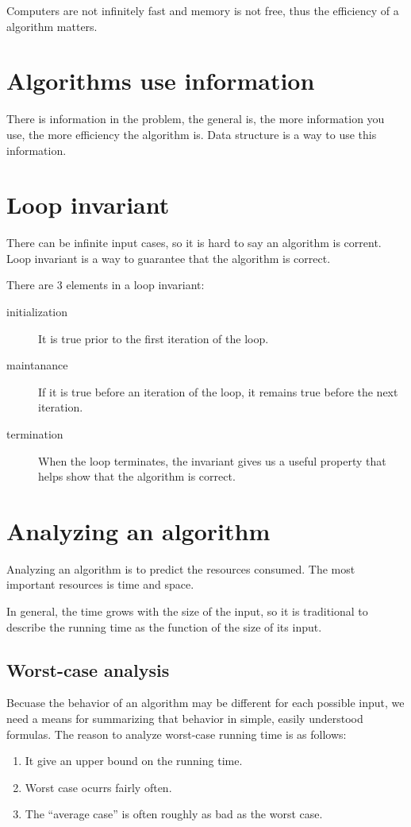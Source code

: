 Computers are not infinitely fast and memory is not free, thus the efficiency of a algorithm matters.


\section{Algorithms use information}


There is information in the problem, the general is, the more information you use, the more efficiency the algorithm is.
Data structure is a way to use this information.


\section{Loop invariant}

There can be infinite input cases, so it is hard to say an algorithm is corrent.
Loop invariant is a way to guarantee that the algorithm is correct.


There are 3 elements in a loop invariant:
\begin{description}
\item[initialization] It is true prior to the first iteration of the loop.
\item[maintanance] If it is true before an iteration of the loop, it remains true before the next iteration.
\item[termination] When the loop terminates, the invariant gives us a useful property that helps show that the algorithm is correct.
\end{description}


\section{Analyzing an algorithm}

Analyzing an algorithm is to predict the resources consumed.
The most important resources is time and space.

In general, the time grows with the size of the input,
so it is traditional to describe the running time as the function of the size of its input.

\subsection{Worst-case analysis}

Becuase the behavior of an algorithm may be different for each possible input, we need a means for summarizing that behavior in simple, easily understood formulas.
The reason to analyze worst-case running time is as follows:
\begin{enumerate}
\item It give an upper bound on the running time.
\item Worst case ocurrs fairly often.
\item The ``average case'' is often roughly as bad as the worst case.
\end{enumerate}


